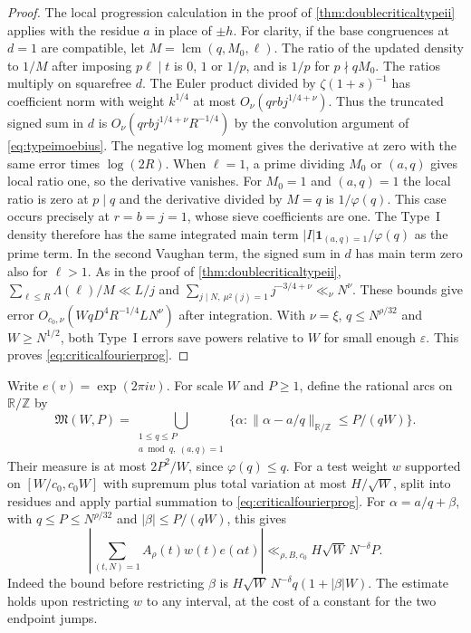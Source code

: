 \documentclass[11pt,a4paper]{article}
\numberwithin{equation}{section}
\begin{document}
\begin{proof}
The local progression calculation in the proof of
\cref{thm:doublecriticaltypeii} applies with the residue
$a$ in place of $\pm h$. For clarity, if the base
congruences at $d=1$ are compatible, let
$M=\operatorname{lcm}(q,M_0,\ell)$. The ratio of the
updated density to $1/M$ after imposing $p\ell\mid t$
is $0$, $1$ or $1/p$, and is $1/p$ for $p\nmid qM_0$.
The ratios multiply on squarefree $d$.
The Euler product divided by $\zeta(1+s)^{-1}$ has
coefficient norm with weight $k^{1/4}$ at most
$O_\nu(qrb j^{1/4+\nu})$.
Thus the truncated signed sum in $d$ is
$O_\nu(qrb j^{1/4+\nu}R^{-1/4})$ by the convolution
argument of \cref{eq:typeimoebius}. The negative log
moment gives the derivative at zero with the same error
times $\log(2R)$. When $\ell=1$, a prime dividing $M_0$
or $(a,q)$ gives local ratio one, so the derivative
vanishes. For $M_0=1$ and $(a,q)=1$ the local ratio
is zero at $p\mid q$ and the derivative divided by
$M=q$ is $1/\varphi(q)$. This case occurs precisely
at $r=b=j=1$, whose sieve coefficients are one.
The Type~I density therefore has the same integrated
main term $|I|\mathbf1_{(a,q)=1}/\varphi(q)$ as the
prime term. In the second Vaughan term, the signed
sum in $d$ has main term zero also for $\ell>1$.
As in the proof of \cref{thm:doublecriticaltypeii},
$\sum_{\ell\le R}\Lambda(\ell)/M\ll L/j$ and
$\sum_{j\mid N,\ \mu^2(j)=1}j^{-3/4+\nu}\ll_\nu N^\nu$.
These bounds give error
$O_{c_0,\nu}(W q D^4 R^{-1/4} L N^\nu)$ after integration.
With $\nu=\xi$, $q\le N^{\rho/32}$ and $W\ge N^{1/2}$,
both Type~I errors save powers relative to $W$ for small
enough $\varepsilon$. This proves \cref{eq:criticalfourierprog}.
\end{proof}

Write $e(v)=\exp(2\pi i v)$. For scale $W$ and $P\ge1$,
define the rational arcs on $\mathbb R/\mathbb Z$ by
\[
 \mathfrak M(W,P)=
 \bigcup_{\substack{1\le q\le P\\a\bmod q,\ (a,q)=1}}
 \{\alpha:\|\alpha-a/q\|_{\mathbb R/\mathbb Z}\le P/(qW)\}.
\]
Their measure is at most $2P^2/W$, since $\varphi(q)\le q$.
For a test weight $w$ supported on $[W/c_0,c_0W]$
with supremum plus total variation at most $H/\sqrt W$,
split into residues and apply partial summation to
\cref{eq:criticalfourierprog}. For $\alpha=a/q+\beta$,
with $q\le P\le N^{\rho/32}$ and $|\beta|\le P/(qW)$,
this gives
\begin{equation}
 \left|\sum_{(t,N)=1} A_\rho(t)w(t)e(\alpha t)\right|
 \ll_{\rho,B,c_0} H\sqrt W\, N^{-\delta}P.
 \label{eq:criticalfourierexp}
\end{equation}
Indeed the bound before restricting $\beta$ is
$H\sqrt W\,N^{-\delta}q(1+|\beta|W)$.
The estimate holds upon restricting $w$ to any interval,
at the cost of a constant for the two endpoint jumps.
\end{document}
